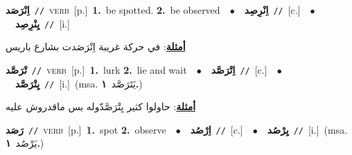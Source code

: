\documentclass[10pt,a4paper,twoside]{article} %
\begin{document}
\begin{multicols}{2}
{\setlength\topsep{0pt}\textbf{\foreignlanguage{arabic}{اِنْرَصَد}}\ {\color{gray}\texttt{//}\color{black}}\ \textsc{verb}\ [p.]\ \textbf{1.}~be spotted.  \textbf{2.}~be observed\ \ $\bullet$\ \ \setlength\topsep{0pt}\textbf{\foreignlanguage{arabic}{اِنْرِصِد}}\ {\color{gray}\texttt{//}\color{black}}\ [c.]\ \ $\bullet$\ \ \setlength\topsep{0pt}\textbf{\foreignlanguage{arabic}{يِنْرِصِد}}\ {\color{gray}\texttt{//}\color{black}}\ [i.]\  \begin{flushright}\color{gray}\foreignlanguage{arabic}{\textbf{\underline{\foreignlanguage{arabic}{أمثلة}}}: في حركة غريبة اِنْرَصَدت بشارع باريس}\end{flushright}\color{black}} \vspace{2mm}

{\setlength\topsep{0pt}\textbf{\foreignlanguage{arabic}{تْرَصَّد}}\ {\color{gray}\texttt{//}\color{black}}\ \textsc{verb}\ [p.]\ \textbf{1.}~lurk  \textbf{2.}~lie and wait\ \ $\bullet$\ \ \setlength\topsep{0pt}\textbf{\foreignlanguage{arabic}{اِتْرَصَّد}}\ {\color{gray}\texttt{//}\color{black}}\ [c.]\ \ $\bullet$\ \ \setlength\topsep{0pt}\textbf{\foreignlanguage{arabic}{يِتْرَصَّد}}\ {\color{gray}\texttt{//}\color{black}}\ [i.]\ \color{gray}(msa. \foreignlanguage{arabic}{يَتَرَصَّد}~\foreignlanguage{arabic}{\textbf{١.}})\color{black}\  \begin{flushright}\color{gray}\foreignlanguage{arabic}{\textbf{\underline{\foreignlanguage{arabic}{أمثلة}}}: حاولوا كثير يِتْرَصَّدّوله بس ماقدروش عليه}\end{flushright}\color{black}} \vspace{2mm}

{\setlength\topsep{0pt}\textbf{\foreignlanguage{arabic}{رَصَد}}\ {\color{gray}\texttt{//}\color{black}}\ \textsc{verb}\ [p.]\ \textbf{1.}~spot  \textbf{2.}~observe\ \ $\bullet$\ \ \setlength\topsep{0pt}\textbf{\foreignlanguage{arabic}{اِرْصُد}}\ {\color{gray}\texttt{//}\color{black}}\ [c.]\ \ $\bullet$\ \ \setlength\topsep{0pt}\textbf{\foreignlanguage{arabic}{يِرْصُد}}\ {\color{gray}\texttt{//}\color{black}}\ [i.]\ \color{gray}(msa. \foreignlanguage{arabic}{يَرْصُد}~\foreignlanguage{arabic}{\textbf{١.}})\color{black}\ } \vspace{2mm}


\end{multicols}
\end{document}
